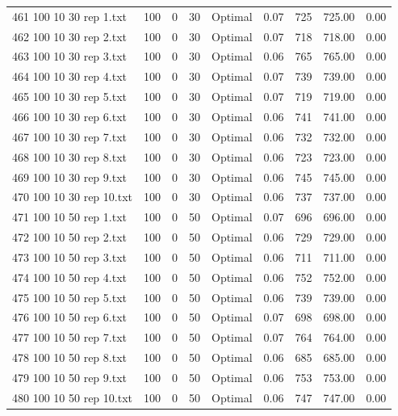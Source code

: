 \begin{longtable}{lrrllrrrr}
461 100 10 30 rep 1.txt & 100 & 0 & 30 & Optimal &  0.07 & 725 & 725.00 &  0.00\\
462 100 10 30 rep 2.txt & 100 & 0 & 30 & Optimal &  0.07 & 718 & 718.00 &  0.00\\
463 100 10 30 rep 3.txt & 100 & 0 & 30 & Optimal &  0.06 & 765 & 765.00 &  0.00\\
464 100 10 30 rep 4.txt & 100 & 0 & 30 & Optimal &  0.07 & 739 & 739.00 &  0.00\\
465 100 10 30 rep 5.txt & 100 & 0 & 30 & Optimal &  0.07 & 719 & 719.00 &  0.00\\
466 100 10 30 rep 6.txt & 100 & 0 & 30 & Optimal &  0.06 & 741 & 741.00 &  0.00\\
467 100 10 30 rep 7.txt & 100 & 0 & 30 & Optimal &  0.06 & 732 & 732.00 &  0.00\\
468 100 10 30 rep 8.txt & 100 & 0 & 30 & Optimal &  0.06 & 723 & 723.00 &  0.00\\
469 100 10 30 rep 9.txt & 100 & 0 & 30 & Optimal &  0.06 & 745 & 745.00 &  0.00\\
470 100 10 30 rep 10.txt & 100 & 0 & 30 & Optimal &  0.06 & 737 & 737.00 &  0.00\\
471 100 10 50 rep 1.txt & 100 & 0 & 50 & Optimal &  0.07 & 696 & 696.00 &  0.00\\
472 100 10 50 rep 2.txt & 100 & 0 & 50 & Optimal &  0.06 & 729 & 729.00 &  0.00\\
473 100 10 50 rep 3.txt & 100 & 0 & 50 & Optimal &  0.06 & 711 & 711.00 &  0.00\\
474 100 10 50 rep 4.txt & 100 & 0 & 50 & Optimal &  0.06 & 752 & 752.00 &  0.00\\
475 100 10 50 rep 5.txt & 100 & 0 & 50 & Optimal &  0.06 & 739 & 739.00 &  0.00\\
476 100 10 50 rep 6.txt & 100 & 0 & 50 & Optimal &  0.07 & 698 & 698.00 &  0.00\\
477 100 10 50 rep 7.txt & 100 & 0 & 50 & Optimal &  0.07 & 764 & 764.00 &  0.00\\
478 100 10 50 rep 8.txt & 100 & 0 & 50 & Optimal &  0.06 & 685 & 685.00 &  0.00\\
479 100 10 50 rep 9.txt & 100 & 0 & 50 & Optimal &  0.06 & 753 & 753.00 &  0.00\\
480 100 10 50 rep 10.txt & 100 & 0 & 50 & Optimal &  0.06 & 747 & 747.00 &  0.00\\
\end{longtable}

